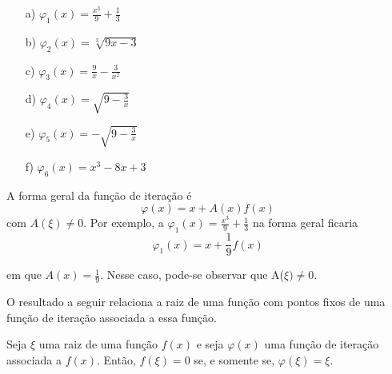 \begin{multicols}{2}
\begin{itemize} %
    \item[a)] $\varphi_1(x) = \frac{x^3}{9} + \frac{1}{3}$
    \item[b)] $\varphi_2(x) = \sqrt[3]{9x-3}$
    \item[c)] $\varphi_3(x) = \frac{9}{x} - \frac{3}{x^2}$
    \item[d)] $\varphi_4(x) = \sqrt{9 - \frac{3}{x}}$
    \item[e)] $\varphi_5(x) = -\sqrt{9 - \frac{3}{x}}$
    \item[f)] $\varphi_6(x) = x^3 - 8x + 3$
\end{itemize}
\end{multicols}
A forma geral da função de iteração é 
\begin{equation}
    \varphi(x) = x + A(x)f(x) \label{it}
\end{equation}
com $A(\xi) \ne 0$.
Por exemplo, a $\varphi_1(x) = \frac{x^3}{9} + \frac{1}{3}$ na forma geral ficaria 
\begin{equation*}
    \varphi_1(x) = x + \frac{1}{9}f(x)
\end{equation*}

em que $A(x) = \frac{1}{9}$. Nesse caso, pode-se observar que A($\xi) \neq 0$.

O resultado a seguir relaciona a raiz de uma função com pontos fixos de uma função de iteração associada a essa função. 

\begin{prop}
Seja $\xi$ uma raiz de uma função $f(x)$ e seja $\varphi(x)$ uma função de iteração associada a $f(x)$. Então, $f(\xi) = 0$ se, e somente se, $\varphi(\xi) = \xi$.
\end{prop}



